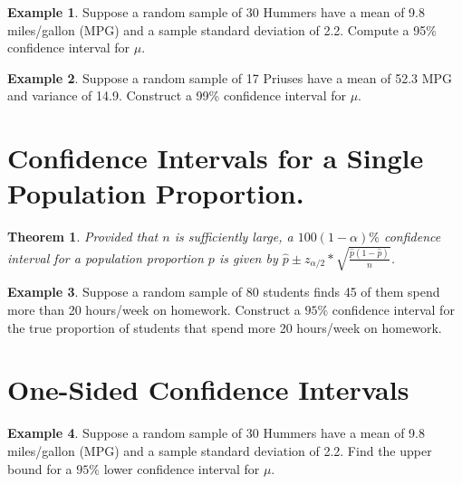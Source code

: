 \documentclass[
  11pt,
  oneside]{book}
\newtheorem{theorem}{Theorem}[chapter]
\theoremstyle{definition}
\theoremstyle{definition}
\newtheorem{example}{Example}[chapter]
\theoremstyle{definition}
\theoremstyle{definition}
\theoremstyle{remark}
\begin{document}
\vspace{3cm}

\begin{example}
Suppose a random sample of 30 Hummers have a mean of 9.8 miles/gallon (MPG) and a sample standard deviation of 2.2. Compute a 95\% confidence interval for \(\mu\).
\end{example}

\newpage

\begin{example}
Suppose a random sample of 17 Priuses have a mean of 52.3 MPG and variance of 14.9. Construct a 99\% confidence interval for \(\mu\).
\end{example}

\newpage

\section{Confidence Intervals for a Single Population Proportion.}\label{confidence-intervals-for-a-single-population-proportion.}

\begin{theorem}
Provided that \(n\) is sufficiently large, a \(100(1 - \alpha)\%\) confidence interval for a population proportion \(p\) is given by \(\hat{p} \pm z_{\alpha/2}*\sqrt{\frac{\hat{p}(1-\hat{p})}{n}}\).
\end{theorem}

\newpage

\begin{example}
Suppose a random sample of 80 students finds 45 of them spend more than 20 hours/week on homework. Construct a \(95\%\) confidence interval for the true proportion of students that spend more 20 hours/week on homework.
\end{example}

\newpage

\section{One-Sided Confidence Intervals}\label{one-sided-confidence-intervals}

\begin{example}
Suppose a random sample of 30 Hummers have a mean of 9.8 miles/gallon (MPG) and a sample standard deviation of 2.2. Find the upper bound for a \(95\%\) lower confidence interval for \(\mu\).
\end{example}

\vspace{6cm}
\end{document}
